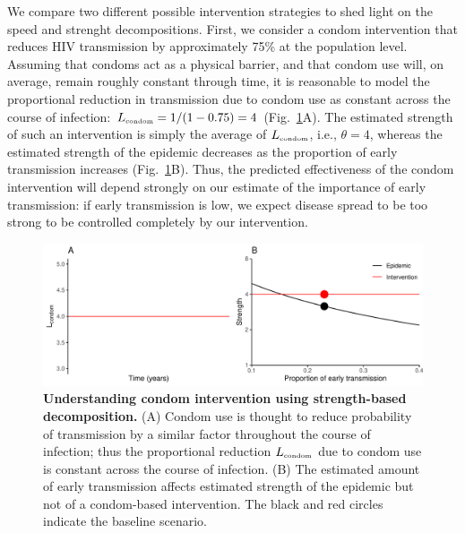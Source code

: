 \documentclass[12pt]{article}
\newcommand{\tsub}[2]{#1_{{\textrm{\tiny #2}}}}
\newcommand{\figref}[1]{Fig.~\ref{fig:#1}}
\newcommand{\figlab}[1]{\label{fig:#1}}
\begin{document}
We compare two different possible intervention strategies to shed light on the speed and strenght decompositions.
First, we consider a condom intervention that reduces HIV transmission by approximately 75\% at the population level.
Assuming that condoms act as a physical barrier, and that condom use will, on average, remain roughly constant through time, it is reasonable to model the proportional reduction in transmission due to condom use as constant across the course of infection: $\tsub{L}{condom} = 1/(1-0.75) = 4$  (\figref{condom}A).
The estimated strength of such an intervention is simply the average of $\tsub{L}{condom}$, i.e., $\theta=4$, whereas the estimated strength of the epidemic decreases as the proportion of early transmission increases (\figref{condom}B).
Thus, the predicted effectiveness of the condom intervention will depend strongly on our estimate of the importance of early transmission: if early transmission is low, we expect disease spread to be too strong to be controlled completely by our intervention.

\begin{figure}[!t]
\includegraphics[width=\textwidth]{../figure/condom.pdf}
\caption{
\textbf{Understanding condom intervention using strength-based decomposition.}
(A) Condom use is thought to reduce probability of transmission by a similar factor throughout the course of infection; thus the proportional reduction $\tsub{L}{condom}$ due to condom use is constant across the course of infection.
(B) The estimated amount of early transmission affects estimated strength of the epidemic but not of a condom-based intervention.
The black and red circles indicate the baseline scenario.
}
\figlab{condom}
\end{figure}
\end{document}
